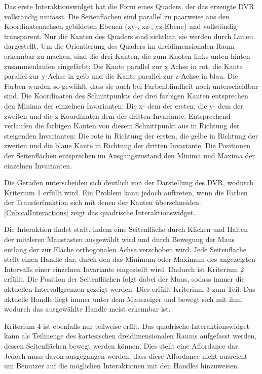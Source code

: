 \documentclass[a4paper,fontsize=12pt,toc=bib,halfparskip,ngerman]{scrartcl}
\begin{document}
Das erste Interaktionswidget hat die Form eines Quaders, der das erzeugte DVR vollst\"andig umfasst. Die Seitenfl\"achen sind parallel zu paarweise aus den Koordinatenachsen gebildeten Ebenen (xy-, xz-, yz-Ebene) und vollst\"andig transparent. Nur die Kanten des Quaders sind sichtbar, sie werden durch Linien dargestellt. Um die Orientierung des Quaders im dreidimensionalen Raum erkennbar zu machen, sind die drei Kanten, die zum Knoten links unten hinten zusammenlaufen eingef\"arbt: Die Kante parallel zur x Achse in rot, die Kante parallel zur y-Achse in gelb und die Kante parallel zur z-Achse in blau. Die Farben wurden so gew\"ahlt, dass sie auch bei Farbenblindheit noch unterscheidbar sind. Die Koordinaten des Schnittpunkts der drei farbigen Kanten entsprechen den Minima der einzelnen Invarianten: Die x- dem der ersten, die y- dem der zweiten und die z-Koordinaten dem der dritten Invariante. Entsprechend verlaufen die farbigen Kanten von diesem Schnittpunkt aus in Richtung der steigenden Invarianten: Die rote in Richtung der ersten, die gelbe in Richtung der zweiten und die blaue Kante in Richtung der dritten Invariante. Die Positionen der Seitenfl\"achen entsprechen im Ausgangszustand den Minima und Maxima der einzelnen Invarianten. 

Die Geraden unterscheiden sich deutlich von der Darstellung des DVR, wodurch Kriterium 1 erf\"ullt wird. Ein Problem kann jedoch auftreten, wenn die Farben der Transferfunktion sich mit denen der Kanten \"uberschneiden. \cref{CubicalInteractions} zeigt das quadrische Interaktionswidget.

Die Interaktion findet statt, indem eine Seitenfl\"ache durch Klicken und Halten der mittleren Maustasten ausgew\"ahlt wird und durch Bewegung der Maus entlang der zur Fl\"ache orthogonalen Achse verschoben wird. Jede Seitenfl\"ache stellt einen Handle dar, durch den das Minimum oder Maximum des angezeigten Intervalls einer einzelnen Invariante eingestellt wird. Dadurch ist Kriterium 2 erf\"ullt. Die Position der Seitenfl\"achen folgt dabei der Maus, sodass immer die aktuellen Intervallgrenzen gezeigt werden. Dies erf\"ullt Kriterium 3 zum Teil: Das aktuelle Handle liegt immer unter dem Mauszeiger und bewegt sich mit ihm, wodurch das ausgew\"ahlte Handle meist erkennbar ist. 

Kriterium 4 ist ebenfalls nur teilweise erf\"llt. Das quadrische Interaktionswidget kann als Teilmenge des kartesischen dreidimensionalen Raums aufgefasst werden, dessen Seitenfl\"achen bewegt werden k\"onnen. Dies stellt eine Affordance dar. Jedoch muss davon ausgegangen werden, dass diese Affordance nicht ausreicht um Benutzer auf die m\"oglichen Interaktionen mit den Handles hinzuweisen. 
\end{document}
